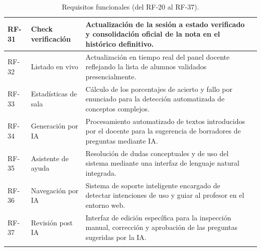 \begin{table}[H]
{\begin{tabularx}{1.1\textwidth}{l P{2.4cm} Y c}
RF-31\label{req:31} & Check verificación & Actualización de la sesión a estado verificado y consolidación oficial de la nota en el histórico definitivo. &  \\ \hline
RF-32\label{req:32} & Listado en vivo & Actualización en tiempo real del panel docente reflejando la lista de alumnos validados presencialmente. &  \\ \hline
RF-33\label{req:33} & Estadísticas de sala & Cálculo de los porcentajes de acierto y fallo por enunciado para la detección automatizada de conceptos complejos. &  \\ \hline
RF-34\label{req:34} & Generación por IA & Procesamiento automatizado de textos introducidos por el docente para la sugerencia de borradores de preguntas mediante IA. &  \\ \hline
RF-35\label{req:35} & Asistente de ayuda & Resolución de dudas conceptuales y de uso del sistema mediante una interfaz de lenguaje natural integrada. &  \\ \hline
RF-36\label{req:36} & Navegación por IA & Sistema de soporte inteligente encargado de detectar intenciones de uso y guiar al profesor en el entorno web. &  \\ \hline
RF-37\label{req:37} & Revisión post IA & Interfaz de edición específica para la inspección manual, corrección y aprobación de las preguntas sugeridas por la IA. &  \\ \bighline
\end{tabularx}%
}
\caption{Requisitos funcionales (del RF-20 al RF-37).}
\label{tab:requisitos_funcionales_2}
\end{table}

